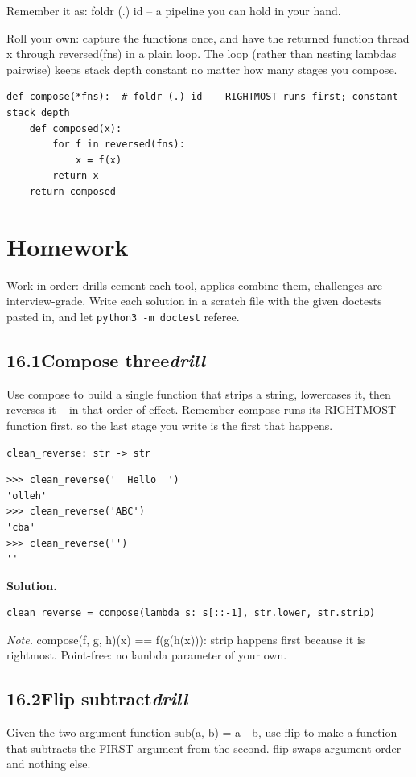\documentclass[10pt,letterpaper]{book}
\begin{document}
Remember it as: foldr (.) id -- a pipeline you can hold in your hand.


Roll your own: capture the functions once, and have the returned function thread x through reversed(fns) in a plain loop. The loop (rather than nesting lambdas pairwise) keeps stack depth constant no matter how many stages you compose.

\begin{lstlisting}[style=ex]
def compose(*fns):  # foldr (.) id -- RIGHTMOST runs first; constant stack depth
    def composed(x):
        for f in reversed(fns):
            x = f(x)
        return x
    return composed
\end{lstlisting}
\section{Homework}
Work in order: drills cement each tool, applies combine them,
challenges are interview-grade. Write each solution in a scratch file with
the given doctests pasted in, and let \texttt{python3 -m doctest} referee.
\subsection*{16.1\quad Compose three\hfill\textnormal{\textit{drill}}}
Use compose to build a single function that strips a string, lowercases it, then reverses it -- in that order of effect. Remember compose runs its RIGHTMOST function first, so the last stage you write is the first that happens.

\noindent\texttt{clean\_reverse: str -> str}
\begin{lstlisting}[style=ex]
>>> clean_reverse('  Hello  ')
'olleh'
>>> clean_reverse('ABC')
'cba'
>>> clean_reverse('')
''
\end{lstlisting}
\noindent\textbf{Solution.}
\begin{lstlisting}[style=code]
clean_reverse = compose(lambda s: s[::-1], str.lower, str.strip)
\end{lstlisting}
\noindent\textit{Note.} compose(f, g, h)(x) == f(g(h(x))): strip happens first because it is rightmost. Point-free: no lambda parameter of your own.

\subsection*{16.2\quad Flip subtract\hfill\textnormal{\textit{drill}}}
Given the two-argument function sub(a, b) = a - b, use flip to make a function that subtracts the FIRST argument from the second. flip swaps argument order and nothing else.
\end{document}
